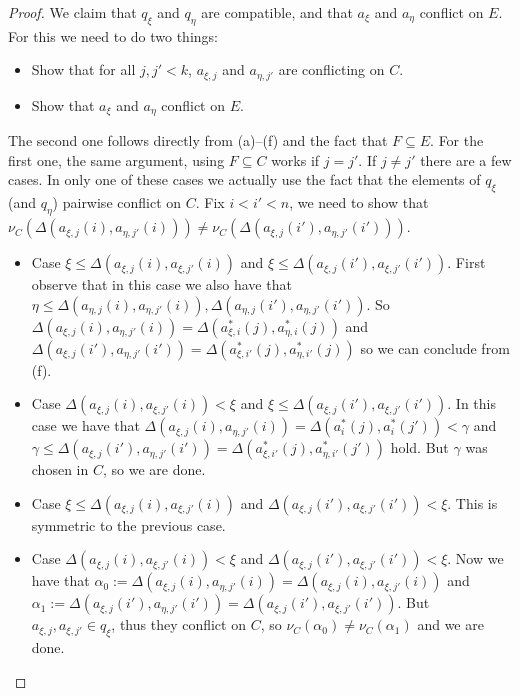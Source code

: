 \documentclass[10pt,a4paper]{amsart}
\theoremstyle{definition}
\newcommand{\seb}{\subseteq}
\newcommand{\1}{\mathbf{1}}
\begin{document}
\begin{proof}
  We claim that $q_{\xi}$ and $q_{\eta}$ are compatible, and
  that $a_{\xi}$ and $a_{\eta}$ conflict on $E$. For this we need to do
  two things:
  \begin{itemize}
    \item Show that for all $j,j' < k$, $a_{\xi,j}$ and $a_{\eta,j'}$ are
    conflicting on $C$. 
    \item Show that $a_{\xi}$ and $a_{\eta}$ conflict on $E$.
  \end{itemize}
  The second one follows directly from (a)--(f) and the fact
  that $F  \seb E$. For the first one, the same argument, using $F \seb
  C$ works if $j = j'$. If $j \neq j'$ there are a few cases. In only
  one of these cases we actually use the fact that the elements of
  $q_{\xi}$ (and $q_{\eta}$) pairwise conflict on $C$. Fix $i < i' < n$,
  we need to show that $\nu_{C}(\Delta(a_{\xi,j}(i),a_{\eta,j'}(i)))
  \neq \nu_{C}(\Delta(a_{\xi,j}(i'),a_{\eta,j'}(i')))$.

  \begin{itemize}
    \item[$\blacktriangleright$] Case
    $\xi \le \Delta(a_{\xi,j}(i),a_{\xi,j'}(i))$ and
    $\xi \le \Delta(a_{\xi,j}(i'),a_{\xi,j'}(i'))$. First observe that
    in this case we also have
    that $\eta \le \Delta(a_{\eta,j}(i),a_{\eta,j'}(i)),
    \Delta(a_{\eta,j}(i'),a_{\eta,j'}(i'))$.
    So
    $\Delta(a_{\xi,j}(i),a_{\eta,j'}(i)) = \Delta(a^{*}_{\xi,i}(j),a^{*}_{\eta,i}(j))$
    and
    $\Delta(a_{\xi,j}(i'),a_{\eta,j'}(i')) = \Delta(a^{*}_{\xi,i'}(j),a^{*}_{\eta,i'}(j))$
    so we can conclude from (f).
    \item[$\blacktriangleright$] Case
    $\Delta(a_{\xi,j}(i),a_{\xi,j'}(i)) < \xi$ and
    $\xi \le \Delta(a_{\xi,j}(i'),a_{\xi,j'}(i'))$.
    In this case
    we have that $\Delta(a_{\xi,j}(i),a_{\eta,j'}(i)) =
    \Delta(a^{*}_{i}(j),a^{*}_{i}(j')) < \gamma$
    and $\gamma \le \Delta(a_{\xi,j}(i'),a_{\eta,j'}(i')) =
    \Delta(a^{*}_{\xi,i'}(j),a^{*}_{\eta,i'}(j'))$
    hold. But $\gamma$ was chosen in $C$, so we are done.
    \item[$\blacktriangleright$] Case
    $\xi \le \Delta(a_{\xi,j}(i),a_{\xi,j'}(i))$ and
    $\Delta(a_{\xi,j}(i'),a_{\xi,j'}(i')) < \xi$.
    This is symmetric to the previous
    case.
    \item[$\blacktriangleright$]
    Case $\Delta(a_{\xi,j}(i),a_{\xi,j'}(i)) < \xi$ and
    $\Delta(a_{\xi,j}(i'),a_{\xi,j'}(i')) < \xi$. Now
    we have that
    $\alpha_{0} := \Delta(a_{\xi,j}(i),a_{\eta,j'}(i))
    = \Delta(a_{\xi,j}(i),a_{\xi,j'}(i))$
    and $\alpha_{1} := \Delta(a_{\xi,j}(i'),a_{\eta,j'}(i'))
    = \Delta(a_{\xi,j}(i'),a_{\xi,j'}(i'))$.
    But $a_{\xi,j}, a_{\xi,j'} \in q_{\xi}$,
    thus they conflict on $C$, so $\nu_{C}(\alpha_{0})
    \neq \nu_{C}(\alpha_{1})$ and we are done.
  \end{itemize}


\end{proof}
\end{document}
